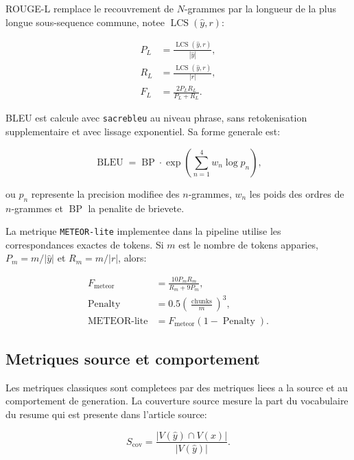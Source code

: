 ROUGE-L remplace le recouvrement de $N$-grammes par la longueur de la plus longue sous-sequence commune, notee $\operatorname{LCS}(\hat{y}, r)$:

\begin{align}
P_L &= \frac{\operatorname{LCS}(\hat{y}, r)}{|\hat{y}|}, \\
R_L &= \frac{\operatorname{LCS}(\hat{y}, r)}{|r|}, \\
F_L &= \frac{2 P_L R_L}{P_L + R_L}.
\label{eq:rouge-l}
\end{align}

BLEU est calcule avec \texttt{sacrebleu} au niveau phrase, sans retokenisation supplementaire et avec lissage exponentiel. Sa forme generale est:

\begin{equation}
\operatorname{BLEU} = \operatorname{BP} \cdot
\exp\left(\sum_{n=1}^{4} w_n \log p_n\right),
\label{eq:bleu}
\end{equation}

ou $p_n$ represente la precision modifiee des $n$-grammes, $w_n$ les poids des ordres de $n$-grammes et $\operatorname{BP}$ la penalite de brievete.

La metrique \texttt{METEOR-lite} implementee dans la pipeline utilise les correspondances exactes de tokens. Si $m$ est le nombre de tokens apparies, $P_m=m/|\hat{y}|$ et $R_m=m/|r|$, alors:

\begin{align}
F_{\mathrm{meteor}} &= \frac{10 P_m R_m}{R_m + 9P_m}, \\
\operatorname{Penalty} &= 0.5 \left(\frac{\operatorname{chunks}}{m}\right)^3, \\
\operatorname{METEOR\mbox{-}lite} &= F_{\mathrm{meteor}}(1-\operatorname{Penalty}).
\label{eq:meteor-lite}
\end{align}

\subsection{Metriques source et comportement}

Les metriques classiques sont completees par des metriques liees a la source et au comportement de generation. La couverture source mesure la part du vocabulaire du resume qui est presente dans l'article source:

\begin{equation}
S_{\mathrm{cov}} =
\frac{|V(\hat{y}) \cap V(x)|}{|V(\hat{y})|}.
\label{eq:source-coverage}
\end{equation}

